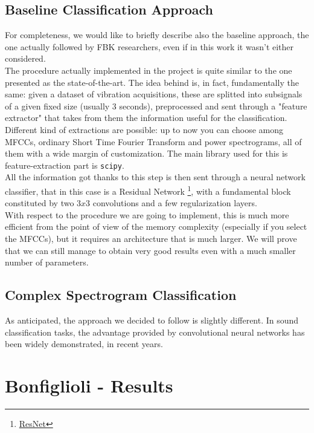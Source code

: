 \documentclass[../main.tex]{subfiles}
\begin{document}
\subsection{Baseline Classification Approach}

For completeness, we would like to briefly describe also the baseline approach, the one actually followed by FBK researchers, even if in this work it wasn't either considered.\\
The procedure actually implemented in the project is quite similar to the one presented as the state-of-the-art. The idea behind is, in fact, fundamentally the same: given a dataset of vibration acquisitions, these are splitted into subsignals of a given fixed size (usually 3 seconds), preprocessed and sent through a "feature extractor" that takes from them the information useful for the classification. Different kind of extractions are possible: up to now you can choose among MFCCs, ordinary Short Time Fourier Transform and power spectrograms, all of them with a wide margin of customization. The main library used for this is feature-extraction part is \texttt{scipy}.\\
All the information got thanks to this step is then sent through a neural network classifier, that in this case is a Residual Network \footnote{\href{https://en.wikipedia.org/wiki/Residual\_neural\_network}{ResNet}}, with a fundamental block constituted by two $3x3$ convolutions and a few regularization layers.\\
With respect to the procedure we are going to implement, this is much more efficient from the point of view of the memory complexity (especially if you select the MFCCs), but it requires an architecture that is much larger. We will prove that we can still manage to obtain very good results even with a much smaller number of parameters.


\subsection{Complex Spectrogram Classification}

As anticipated, the approach we decided to follow is slightly different. In sound classification tasks, the advantage provided by convolutional neural networks has been widely demonstrated, in recent years. 


\section{Bonfiglioli - Results}
\end{document}
